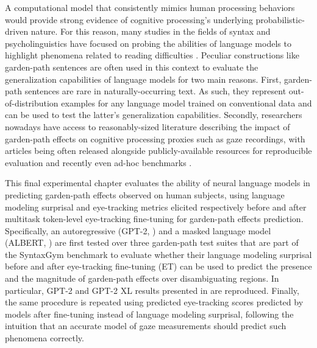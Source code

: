 \documentclass[a4paper, nobind]{templates/ociamthesis}
\begin{document}
A computational model that consistently mimics human processing behaviors would provide strong evidence of cognitive processing's underlying probabilistic-driven nature. For this reason, many studies in the fields of syntax and psycholinguistics have focused on probing the abilities of language models to highlight phenomena related to reading difficulties \autocites{linzen-etal-2016-assessing}{gulordava-etal-2018-colorless}{futrell-etal-2019-neural}. Peculiar constructions like garden-path sentences are often used in this context to evaluate the generalization capabilities of language models for two main reasons. First, garden-path sentences are rare in naturally-occurring text. As such, they represent out-of-distribution examples for any language model trained on conventional data and can be used to test the latter's generalization capabilities. Secondly, researchers nowadays have access to reasonably-sized literature describing the impact of garden-path effects on cognitive processing proxies such as gaze recordings, with articles being often released alongside publicly-available resources for reproducible evaluation \autocites{prasad-linzen-2019-self}{prasad-linzen-2019-much} and recently even ad-hoc benchmarks \autocite{gauthier-etal-2020-syntaxgym}.

This final experimental chapter evaluates the ability of neural language models in predicting garden-path effects observed on human subjects, using language modeling surprisal and eye-tracking metrics elicited respectively before and after multitask token-level eye-tracking fine-tuning for garden-path effects prediction. Specifically, an autoregressive (GPT-2, \textcite{radford-etal-2019-language}) and a masked language model (ALBERT, \textcite{lan-etal-2020-albert}) are first tested over three garden-path test suites that are part of the SyntaxGym benchmark to evaluate whether their language modeling surprisal before and after eye-tracking fine-tuning (ET) can be used to predict the presence and the magnitude of garden-path effects over disambiguating regions. In particular, GPT-2 and GPT-2 XL results presented in \textcite{hu-etal-2020-systematic} are reproduced. Finally, the same procedure is repeated using predicted eye-tracking scores predicted by models after fine-tuning instead of language modeling surprisal, following the intuition that an accurate model of gaze measurements should predict such phenomena correctly.
\end{document}
